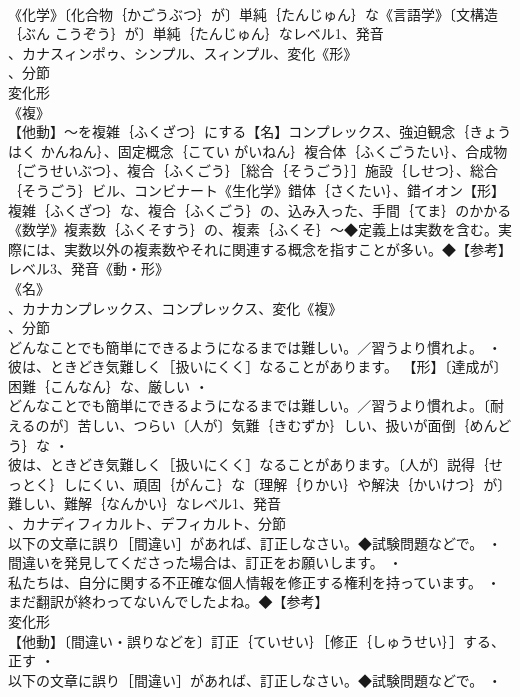 \documentclass[8pt]{extreport}
\begin{document}
\begin{CJK}{UTF8}{min}
\\	《化学》〔化合物｛かごうぶつ｝が〕単純｛たんじゅん｝な《言語学》〔文構造｛ぶん こうぞう｝が〕単純｛たんじゅん｝なレベル1、発音
\\	、カナスィンポゥ、シンプル、スィンプル、変化《形》
\\	、分節
\\	変化形 
\\	《複》
\\	【他動】～を複雑｛ふくざつ｝にする【名】コンプレックス、強迫観念｛きょうはく かんねん｝、固定概念｛こてい がいねん｝複合体｛ふくごうたい｝、合成物｛ごうせいぶつ｝、複合｛ふくごう｝［総合｛そうごう｝］施設｛しせつ｝、総合｛そうごう｝ビル、コンビナート《生化学》錯体｛さくたい｝、錯イオン【形】複雑｛ふくざつ｝な、複合｛ふくごう｝の、込み入った、手間｛てま｝のかかる《数学》複素数｛ふくそすう｝の、複素｛ふくそ｝～◆定義上は実数を含む。実際には、実数以外の複素数やそれに関連する概念を指すことが多い。◆【参考】
\\	レベル3、発音《動・形》
\\	《名》
\\	、カナカンプレックス、コンプレックス、変化《複》
\\	、分節
\\	どんなことでも簡単にできるようになるまでは難しい。／習うより慣れよ。 ・
\\	彼は、ときどき気難しく［扱いにくく］なることがあります。		【形】〔達成が〕困難｛こんなん｝な、厳しい ・
\\	どんなことでも簡単にできるようになるまでは難しい。／習うより慣れよ。〔耐えるのが〕苦しい、つらい〔人が〕気難｛きむずか｝しい、扱いが面倒｛めんどう｝な ・
\\	彼は、ときどき気難しく［扱いにくく］なることがあります。〔人が〕説得｛せっとく｝しにくい、頑固｛がんこ｝な〔理解｛りかい｝や解決｛かいけつ｝が〕難しい、難解｛なんかい｝なレベル1、発音
\\	、カナディフィカルト、デフィカルト、分節
\\	以下の文章に誤り［間違い］があれば、訂正しなさい。◆試験問題などで。 ・
\\	間違いを発見してくださった場合は、訂正をお願いします。 ・
\\	私たちは、自分に関する不正確な個人情報を修正する権利を持っています。 ・
\\	まだ翻訳が終わってないんでしたよね。◆【参考】
\\	変化形 
\\	【他動】〔間違い・誤りなどを〕訂正｛ていせい｝［修正｛しゅうせい｝］する、正す ・
\\	以下の文章に誤り［間違い］があれば、訂正しなさい。◆試験問題などで。 ・

\end{CJK}
\end{document}
